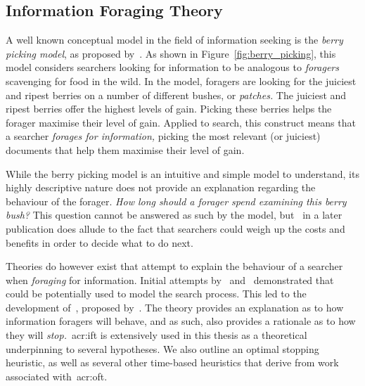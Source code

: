 \subsection{Information Foraging Theory}\label{sec:stopping_background:theoretical:ift}
A well known conceptual model in the field of information seeking is the \emph{berry picking model}, as proposed by~\cite{bates1989berry_picking}. As shown in Figure~\ref{fig:berry_picking}, this model considers searchers looking for information to be analogous to \emph{foragers} scavenging for food in the wild. In the model, foragers are looking for the juiciest and ripest berries on a number of different bushes, or \emph{patches.} The juiciest and ripest berries offer the highest levels of gain. Picking these berries helps the forager maximise their level of gain. Applied to search, this construct means that a searcher \emph{forages for information,} picking the most relevant (or juiciest) documents that help them maximise their level of gain.

While the berry picking model is an intuitive and simple model to understand, its highly descriptive nature does not provide an explanation regarding the behaviour of the forager. \emph{How long should a forager spend examining this berry bush?} This question cannot be answered as such by the model, but~\cite{bates1989alluding} in a later publication does allude to the fact that searchers could weigh up the costs and benefits in order to decide what to do next.

Theories do however exist that attempt to explain the behaviour of a searcher when \emph{foraging} for information. Initial attempts by~\cite{russell1993sense_making} and~\cite{sandstrom1994optimal_foraging} demonstrated that~~\citep{stephens1986foraging_theory} could be potentially used to model the search process. This led to the development of~, proposed by~\cite{pirolli1999ift}. The theory provides an explanation as to how information foragers will behave, and as such, also provides a rationale as to how they will \emph{stop.}~\gls{acr:ift} is extensively used in this thesis as a theoretical underpinning to several hypotheses. We also outline an optimal stopping heuristic, as well as several other time-based heuristics that derive from work associated with~\gls{acr:oft}.

